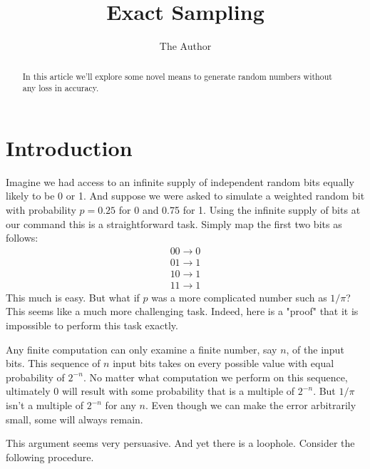 \documentclass{article}
\begin{document}
\title{Exact Sampling}
\author{The Author}

\maketitle

\begin{abstract}
In this article we'll explore some novel means to generate random numbers without any loss in accuracy. 
\end{abstract}


\noindent
\section{Introduction}

Imagine we had access to an infinite supply of independent random bits equally likely to be 0 or 1. And suppose we were asked to simulate a weighted random bit with probability $p=0.25$ for 0 and 0.75 for 1. Using the infinite supply of bits at our command this is a straightforward task. Simply map the first two bits as follows:
\[
\begin{split}
00 \rightarrow 0\\
01 \rightarrow 1\\
10 \rightarrow 1\\
11 \rightarrow 1
\end{split}
\]
This much is easy. But what if $p$ was a more complicated number such as $1/\pi$? This seems like a much more challenging task. Indeed, here is a "proof" that it is impossible to perform this task exactly.

Any finite computation can only examine a finite number, say $n$, of the input bits. This sequence of $n$ input bits takes on every possible value with equal probability of $2^{-n}$. No matter what computation we perform on this sequence, ultimately 0 will result with some probability that is a multiple of $2^{-n}$. But $1/\pi$ isn't a multiple of $2^{-n}$ for any $n$. Even though we can make the error arbitrarily small, some will always remain.

This argument seems very persuasive. And yet there is a loophole. Consider the following procedure.
\end{document}
